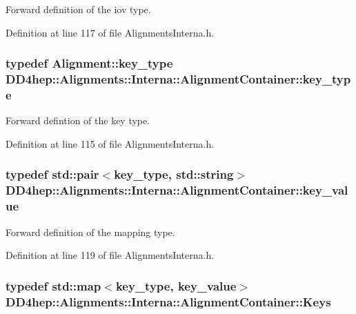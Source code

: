 Forward definition of the iov type. 

Definition at line 117 of file AlignmentsInterna.h.\hypertarget{class_d_d4hep_1_1_alignments_1_1_interna_1_1_alignment_container_a7395f0e25d9e524d2a2bd7df0f4364e6}{
\subsubsection[{key\_\-type}]{\setlength{\rightskip}{0pt plus 5cm}typedef {\bf Alignment::key\_\-type} {\bf DD4hep::Alignments::Interna::AlignmentContainer::key\_\-type}}}
\label{class_d_d4hep_1_1_alignments_1_1_interna_1_1_alignment_container_a7395f0e25d9e524d2a2bd7df0f4364e6}


Forward defintion of the key type. 

Definition at line 115 of file AlignmentsInterna.h.\hypertarget{class_d_d4hep_1_1_alignments_1_1_interna_1_1_alignment_container_a64a96ad5b67f6e67b12fd3aaaa8bbcb8}{
\subsubsection[{key\_\-value}]{\setlength{\rightskip}{0pt plus 5cm}typedef std::pair$<${\bf key\_\-type}, std::string$>$ {\bf DD4hep::Alignments::Interna::AlignmentContainer::key\_\-value}}}
\label{class_d_d4hep_1_1_alignments_1_1_interna_1_1_alignment_container_a64a96ad5b67f6e67b12fd3aaaa8bbcb8}


Forward definition of the mapping type. 

Definition at line 119 of file AlignmentsInterna.h.\hypertarget{class_d_d4hep_1_1_alignments_1_1_interna_1_1_alignment_container_a3fc62784c22ba44d9ac63c424ec55799}{
\subsubsection[{Keys}]{\setlength{\rightskip}{0pt plus 5cm}typedef std::map$<${\bf key\_\-type}, {\bf key\_\-value}$>$ {\bf DD4hep::Alignments::Interna::AlignmentContainer::Keys}}}
\label{class_d_d4hep_1_1_alignments_1_1_interna_1_1_alignment_container_a3fc62784c22ba44d9ac63c424ec55799}



